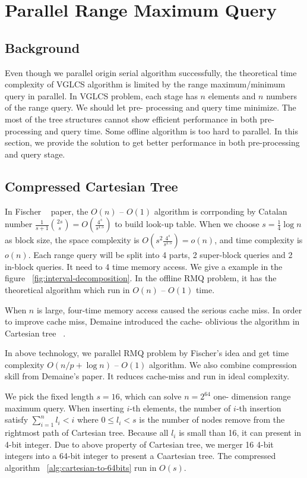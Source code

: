 \section{Parallel Range Maximum Query}
\label{sec:parallelRMQ}

\subsection{Background}

Even though we parallel origin serial algorithm successfully, the
theoretical time complexity of VGLCS algorithm is limited by the range
maximum/minimum query in parallel.  In VGLCS problem, each stage has
$n$ elements and $n$ numbers of the range query.  We should let pre-
processing and query time minimize.  The most of the tree structures
cannot show efficient performance in both pre-processing and query
time.  Some offline algorithm is too hard to parallel.  In this
section, we provide the solution to get better performance in both
pre-processing and query stage.

\subsection{Compressed Cartesian Tree}

In Fischer ~\cite{Fischer2006TheoreticalAP} paper, the $O(n)$ -- $O(1)$ algorithm is
corrponding by Catalan number $\frac{1}{s+1}\binom{2s}{s} =
O(\frac{4^s}{s^{1.5}})$ to build look-up table.  When we choose $s =
\frac{1}{4} \log n$ as block size, the space complexity is $O(s^2
\frac{4^s}{s^{1.5}}) = o(n)$, and time complexity is $o(n)$.  Each
range query will be split into 4 parts, 2 super-block queries and 2
in-block queries. It need to 4 time memory access.  We give a example
in the figure ~\ref{fig:interval-decomposition}.  In the offline RMQ
problem, it has the theoretical algorithm which run in $O(n)$ --
$O(1)$ time.

When $n$ is large, four-time memory access caused the serious cache
miss. In order to improve cache miss, Demaine introduced the cache-
oblivious the algorithm in Cartesian tree ~\cite{Demaine2009OnCT}.

In above technology, we parallel RMQ problem by Fischer's idea and get
time complexity $O(n / p + \log n)$ -- $O(1)$ algorithm.  We also
combine compression skill from Demaine's paper. It reduces cache-miss
and run in ideal complexity.

We pick the fixed length $s = 16$, which can solve $n = 2^{64}$ one-
dimension range maximum query.  When inserting $i$-th elements, the
number of $i$-th insertion satisfy $\sum_{i=1}^{n} l_i < i$ where $0
\le l_i < s$ is the number of nodes remove from the rightmost path of
Cartesian tree.  Because all $l_i$ is small than 16, it can present in
4-bit integer.  Due to above property of Cartesian tree, we merger 16
4-bit integers into a 64-bit integer to present a Caartesian tree.
The compressed algorithm ~\ref{alg:cartesian-to-64bits} run in $O(s)$.

